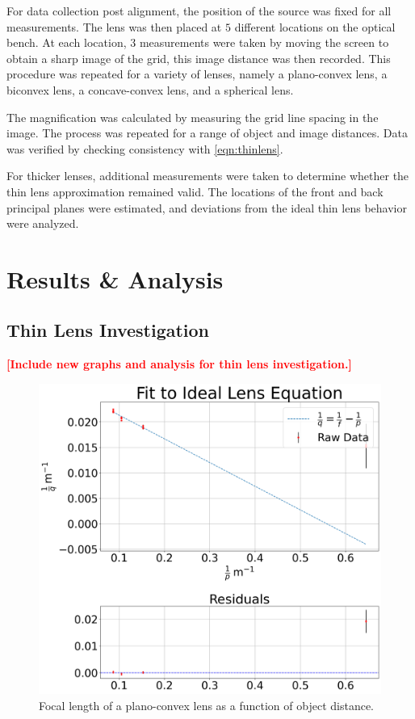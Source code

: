\documentclass[aip, cp, amsmath, amssymb, reprint, nofootinbib]{revtex4-2}
\begin{document}
        For data collection post alignment, the position of the source was fixed for all measurements. The lens was then placed at $5$ different locations on the optical bench. At each location, $3$ measurements were taken by moving the screen to obtain a sharp image of the grid, this image distance was then recorded. This procedure was repeated for a variety of lenses, namely a plano-convex lens, a biconvex lens, a concave-convex lens, and a spherical lens. 
        
        The magnification was calculated by measuring the grid line spacing in the image. The process was repeated for a range of object and image distances. Data was verified by checking consistency with \eqref{eqn:thinlens}.

        For thicker lenses, additional measurements were taken to determine whether the thin lens approximation remained valid. The locations of the front and back principal planes were estimated, and deviations from the ideal thin lens behavior were analyzed.



    \section{Results \& Analysis}
        \subsection{Thin Lens Investigation}
            \textcolor{red}{\textbf{[Include new graphs and analysis for thin lens investigation.]}}

            \begin{figure}[H]
                \centering
                \includegraphics[width=0.9\linewidth]{figures/ideallens.png}
                \caption{Focal length of a plano-convex lens as a function of object distance.}
                \label{fig:thin-lens}
            \end{figure}
\end{document}

